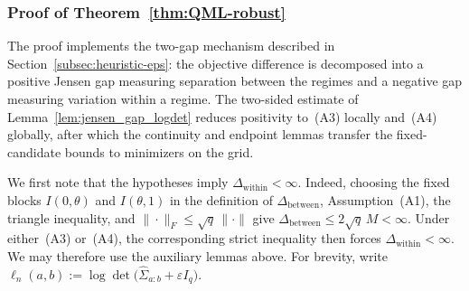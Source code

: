 \documentclass[10pt, letterpaper]{amsart}
\begin{document}
\subsubsection{Proof of Theorem~\ref{thm:QML-robust}}\label{sec:proof_consistency_finite_signal_to_noise}

The proof implements the two-gap mechanism described in
Section~\ref{subsec:heuristic-eps}: the objective difference is decomposed
into a positive Jensen gap measuring separation between the regimes and a
negative gap measuring variation within a regime.
The two-sided estimate of Lemma~\ref{lem:jensen_gap_logdet} reduces positivity
to~\textup{(A3)} locally and~\textup{(A4)} globally, after which the continuity
and endpoint lemmas transfer the fixed-candidate bounds to minimizers on the
grid.

We first note that the hypotheses imply
$\Delta_{\mathrm{within}}<\infty$. Indeed, choosing the fixed blocks
$I(0,\theta)$ and $I(\theta,1)$ in the definition of
$\Delta_{\mathrm{between}}$, Assumption~(A1), the triangle inequality, and
$\|\cdot\|_F\leq\sqrt q\,\|\cdot\|$ give $\Delta_{\mathrm{between}}\leq2\sqrt q\,M<\infty$.
Under either~(A3) or~(A4), the corresponding strict inequality then forces
$\Delta_{\mathrm{within}}<\infty$. We may therefore use the auxiliary
lemmas above. For brevity, write $\ell_n(a,b):=\log\det\bigl(\widehat\Sigma_{a:b}+\varepsilon I_q\bigr)$.
\end{document}
